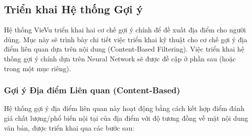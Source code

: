     \subsection{Triển khai Hệ thống Gợi ý}
\label{subsec:recsys_implementation}

Hệ thống VieVu triển khai hai cơ chế gợi ý chính để đề xuất địa điểm cho người dùng. Mục này sẽ trình bày chi tiết việc triển khai kỹ thuật cho cơ chế gợi ý địa điểm liên quan dựa trên nội dung (Content-Based Filtering). Việc triển khai hệ thống gợi ý chính dựa trên Neural Network sẽ được đề cập ở phần sau (hoặc trong một mục riêng).

\subsubsection{Gợi ý Địa điểm Liên quan (Content-Based)}
\label{subsubsec:cb_recsys_impl}
Hệ thống gợi ý địa điểm liên quan này hoạt động bằng cách kết hợp điểm đánh giá chất lượng/phổ biến nội tại của địa điểm với độ tương đồng về mặt nội dung văn bản, được triển khai qua các bước sau:

